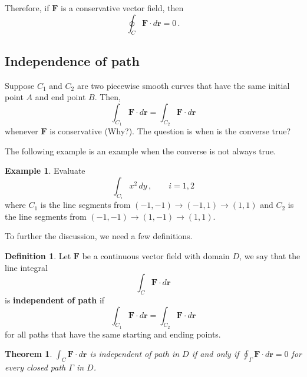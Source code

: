 \documentclass[
]{book}
\newtheorem{theorem}{Theorem}[chapter]
\theoremstyle{definition}
\newtheorem{definition}{Definition}[chapter]
\theoremstyle{definition}
\newtheorem{example}{Example}[chapter]
\theoremstyle{definition}
\theoremstyle{definition}
\theoremstyle{remark}
\begin{document}
Therefore, if \(\mathbf{F}\) is a conservative vector field, then
\begin{equation*}
    \oint_C \mathbf{F} \cdot d\mathbf{r} = 0 \,.
\end{equation*}

\hypertarget{independence-of-path}{%
\subsection{Independence of path}\label{independence-of-path}}

Suppose \(C_1\) and \(C_2\) are two piecewise smooth curves that have the same initial point \(A\)
and end point \(B\).
Then,
\begin{equation*}
    \int_{C_1} \mathbf{F}\cdot d\mathbf{r} 
    =
    \int_{C_2} \mathbf{F} \cdot d\mathbf{r} 
\end{equation*}
whenever \(\mathbf{F}\) is conservative (Why?).
The question is when is the converse true?

The following example is an example when the converse is not always true.

\begin{example}
Evaluate
\begin{equation*}
    \int_{C_i}  x^2 \, dy \,, \qquad i = 1,2
\end{equation*}
where \(C_1\) is the line segments from \((-1,-1) \to (-1,1) \to (1,1)\) and
\(C_2\) is the line segments from \((-1,-1) \to (1,-1) \to (1,1)\).
\end{example}

To further the discussion, we need a few definitions.

\begin{definition}
Let \(\mathbf{F}\) be a continuous vector field with domain \(D\), we say that the
line integral
\begin{equation*}
    \int_C \mathbf{F} \cdot d\mathbf{r} 
\end{equation*}
is \textbf{independent of path} if
\begin{equation*}
    \int_{C_1} \mathbf{F}\cdot d\mathbf{r} 
    =
    \int_{C_2} \mathbf{F} \cdot d\mathbf{r} 
\end{equation*}
for all paths that have the same starting and ending points.
\end{definition}

\begin{theorem}
\(\int_C \mathbf{F}\cdot d\mathbf{r}\) is independent of path in \(D\) if and only if
\(\oint_\Gamma \mathbf{F} \cdot d\mathbf{r} = 0\) for every closed path \(\Gamma\) in \(D\).
\end{theorem}
\end{document}
